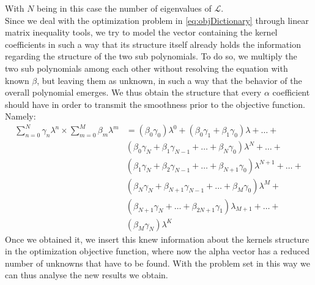 With $N$ being in this case the number of eigenvalues of $\mathcal{L}$.\\

Since we deal with the optimization problem in \autoref{eq:objDictionary} through linear matrix inequality tools, we try to model the vector containing the kernel coefficients in such a way that its structure itself already holds the information regarding the structure of the two sub polynomials. To do so, we multiply the two sub polynomials among each other without resolving the equation with known $\beta$, but leaving them as unknown, in such a way that the behavior of the overall polynomial emerges. We thus obtain the structure that every $\alpha$ coefficient should have in order to transmit the smoothness prior to the objective function. Namely:
\begin{equation}
  \begin{split}
    \sum_{n=0}^N\gamma_n \lambda^n \times \sum_{m=0}^M \beta_m \lambda^m &= (\beta_0  \gamma_0)\lambda^0   + (\beta_0 \gamma_1 + \beta_1 \gamma_0)\lambda + \dots + \\
    &(\beta_0 \gamma_N + \beta_1 \gamma_{N-1} + \dots + \beta_N \gamma_0)\lambda^N + \dots + \\
    &(\beta_1 \gamma_N + \beta_2 \gamma_{N-1} + \dots + \beta_{N+1} \gamma_0)\lambda^{N+1} + \dots +\\
    &(\beta_{N} \gamma_{N} + \beta_{N+1} \gamma_{N-1} + \dots + \beta_{M} \gamma_0)\lambda^{M} + \\
    &(\beta_{N+1} \gamma_{N} + \dots + \beta_{2N + 1} \gamma_1)\lambda_{M+1} + \dots +\\
    &(\beta_M \gamma_N)\lambda^{K}
  \end{split}
  \label{eq:sviluppo}
\end{equation}
Once we obtained it, we insert this knew information about the kernels structure in the optimization objective function, where now the alpha vector has a reduced number of unknowns that have to be found. With the problem set in this way we can thus analyse the new results we obtain. 

